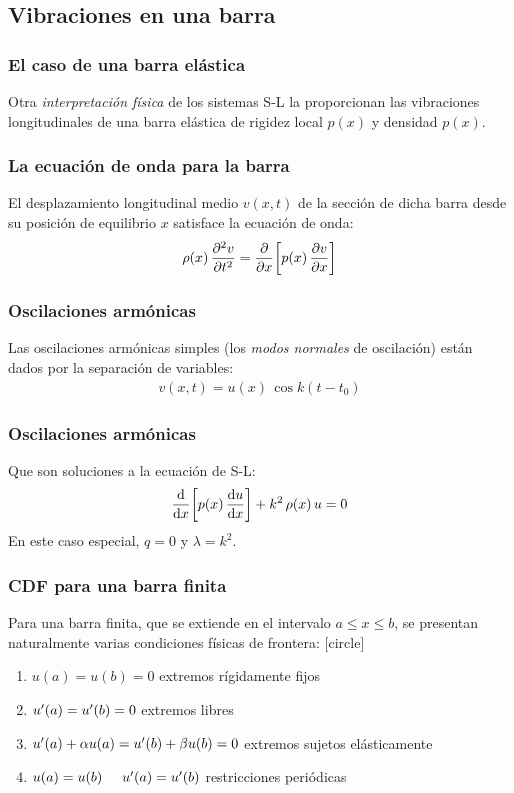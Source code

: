 \documentclass[12pt]{beamer}
\begin{document}
\subsection{Vibraciones en una barra}

\begin{frame}
\frametitle{El caso de una barra elástica}
Otra \emph{interpretación física} de los sistemas S-L la proporcionan \textcolor{OliveGreen}{las vibraciones longitudinales de una barra elástica} de rigidez local $p (x)$ y densidad $p (x)$.
\end{frame}
\begin{frame}
\frametitle{La ecuación de onda para la barra}
El desplazamiento longitudinal medio $v (x, t)$ de la sección de dicha barra desde su posición de equilibrio $x$ satisface la ecuación de onda:
\pause
\begin{align*}
\rho (x) \, \pdv[2]{v}{t} = \pdv{x} \bigg[ p (x) \, \pdv{v}{x} \bigg]
\end{align*}
\end{frame}
\begin{frame}
\frametitle{Oscilaciones armónicas}
Las oscilaciones armónicas simples (los \emph{modos normales} de oscilación) están dados por la separación de variables:
\pause
\begin{align*}
v (x, t) = u (x) \, \cos k(t - t_{0})
\end{align*}
\end{frame}
\begin{frame}
\frametitle{Oscilaciones armónicas}
Que son soluciones a la ecuación de S-L:
\pause
\begin{align*}
\dv{x} \bigg[ p (x) \, \dv{u}{x} \bigg] + k^{2} \, \rho (x) \, u = 0
\end{align*}
En este caso especial, $q = 0$ y $\lambda = k^{2}$.
\end{frame}
\begin{frame}
\frametitle{CDF para una barra finita}
Para una barra finita, que se extiende en el intervalo $a \leq x \leq b$, se presentan naturalmente varias condiciones físicas de frontera:
\pause
{}
[circle]
\begin{enumerate}[<+->]
\item $u (a) = u (b) = 0$ extremos rígidamente fijos
\item ${u}^{\prime} (a) = {u}^{\prime} (b) = 0$ extremos libres
\item ${u}^{\prime} (a) + \alpha u (a) = {u}^{\prime} (b) + \beta u (b) = 0$ extremos sujetos elásticamente
\item $u (a) = u (b) \hspace{0.5cm} {u}^{\prime} (a) = {u}^{\prime} (b)$ restricciones periódicas
\end{enumerate}
\end{frame}
\end{document}
